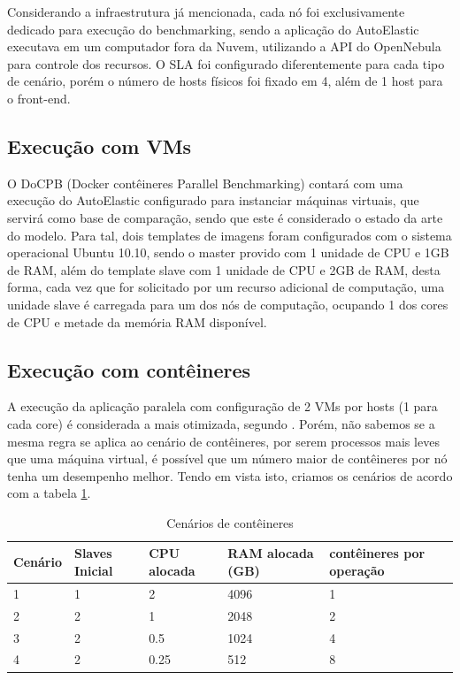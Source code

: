 \documentclass[twoside,english,brazilian]{UNISINOSartigo}
\begin{document}
\begin{itemize}
Considerando a infraestrutura já mencionada, cada nó foi exclusivamente dedicado para execução do benchmarking, sendo a aplicação do AutoElastic executava em um computador fora da Nuvem, utilizando a API do OpenNebula para controle dos recursos. O SLA foi configurado diferentemente para cada tipo de cenário, porém o número de hosts físicos foi fixado em 4, além de 1 host para o front-end. 

\subsection{Execução com VMs}

O DoCPB (Docker contêineres Parallel Benchmarking) contará com uma execução do AutoElastic configurado para instanciar máquinas virtuais, que servirá como base de comparação, sendo que este é considerado o estado da arte do modelo. Para tal, dois templates de imagens foram configurados com o sistema operacional Ubuntu 10.10, sendo o master provido com 1 unidade de CPU e 1GB de RAM, além do template slave com 1 unidade de CPU e 2GB de RAM, desta forma, cada vez que for solicitado por um recurso adicional de computação, uma unidade slave é carregada para um dos nós de computação, ocupando 1 dos cores de CPU e metade da memória RAM disponível.

\subsection{Execução com contêineres}

A execução da aplicação paralela com configuração de 2 VMs por hosts (1 para cada core) é considerada a mais otimizada, segundo . Porém, não sabemos se a mesma regra se aplica ao cenário de contêineres, por serem processos mais leves que uma máquina virtual, é possível que um número maior de contêineres por nó tenha um desempenho melhor. Tendo em vista isto, criamos os cenários de acordo com a tabela \ref{tab:table3}.

\begin{table}[]
\centering
\caption{Cenários de contêineres}
\label{tab:table3}
\begin{tabular}{|l|l|l|l|l|}
\hline
\textbf{Cenário} & \textbf{Slaves Inicial} & \textbf{CPU alocada} & \textbf{RAM alocada (GB)} & \textbf{contêineres por operação} \\ \hline
1                & 1                       & 2                    & 4096                      & 1                                \\ \hline
2                & 2                       & 1                    & 2048                      & 2                                \\ \hline
3                & 2                       & 0.5                  & 1024                      & 4                                \\ \hline
4                & 2                       & 0.25                 & 512                       & 8                                \\ \hline
\end{tabular}
\end{table}


\end{itemize}
\end{document}
